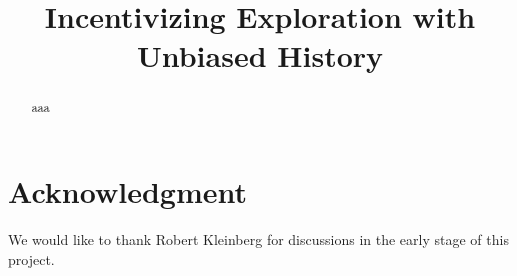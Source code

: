 \documentclass[11pt]{article}
\title{Incentivizing Exploration with Unbiased History}
\author{
}
\begin{document}
\begin{titlepage}
\maketitle

\thispagestyle{empty}
\begin{abstract}
aaa
\end{abstract}
\end{titlepage}




%










\section*{Acknowledgment}
We would like to thank Robert Kleinberg for discussions in the early stage of this project.

\appendix





\end{document}
